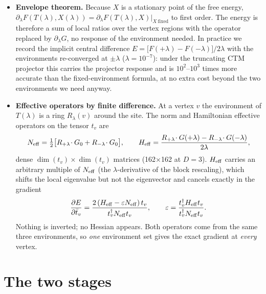 \documentclass[11pt]{article}
\begin{document}
\begin{itemize}
\item \textbf{Envelope theorem.} Because $X$ is a stationary point of the free energy,
  $\partial_\lambda F(T(\lambda),X(\lambda))=\partial_\lambda F(T(\lambda),X)|_{X\ \mathrm{fixed}}$
  to first order. The energy is therefore a sum of local ratios over the vertex regions with the
  operator replaced by $\partial_\lambda G$, no response of the environment needed. In practice we
  record the implicit central difference $E=\big[F(+\lambda)-F(-\lambda)\big]/2\lambda$ with the
  environments re-converged at $\pm\lambda$ ($\lambda=10^{-7}$): under the truncating CTM
  projector this carries the projector response and is $10^2$--$10^3$ times more accurate than the
  fixed-environment formula, at no extra cost beyond the two environments we need anyway.
\item \textbf{Effective operators by finite difference.} At a vertex $v$ the environment of
  $T(\lambda)$ is a ring $R_\lambda(v)$ around the site. The norm and Hamiltonian effective
  operators on the tensor $t_v$ are
  \begin{equation}
    N_{\rm eff}=\tfrac12\big[R_{+\lambda}\!\cdot G_0 + R_{-\lambda}\!\cdot G_0\big],\qquad
    H_{\rm eff}=\frac{R_{+\lambda}\!\cdot G(+\lambda)-R_{-\lambda}\!\cdot G(-\lambda)}{2\lambda},
  \end{equation}
  dense $\dim(t_v)\times\dim(t_v)$ matrices (162$\times$162 at $D=3$). $H_{\rm eff}$ carries an
  arbitrary multiple of $N_{\rm eff}$ (the $\lambda$-derivative of the block rescaling), which
  shifts the local eigenvalue but not the eigenvector and cancels exactly in the gradient
  \begin{equation}
    \frac{\partial E}{\partial \bar t_v}=\frac{2\,(H_{\rm eff}-\varepsilon N_{\rm eff})\,t_v}{t_v^\dagger N_{\rm eff}t_v},
    \qquad \varepsilon=\frac{t_v^\dagger H_{\rm eff}t_v}{t_v^\dagger N_{\rm eff}t_v}.
  \end{equation}
  Nothing is inverted; no Hessian appears. Both operators come from the same three
  environments, so \emph{one} environment set gives the exact gradient at \emph{every} vertex.
\end{itemize}

\section*{The two stages}
\end{document}
